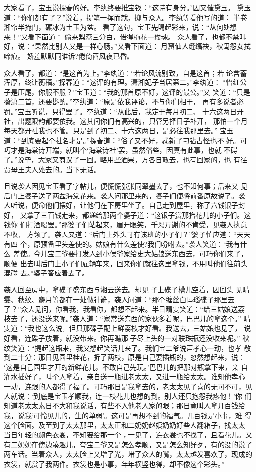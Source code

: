 大家看了，宝玉说探春的好。李纨终要推宝钗：“这诗有身分。”因又催黛玉。
黛玉道：“你们都有了？”说着，提笔一挥而就，掷与众人。李纨等看他写的道：
半卷湘帘半掩门，碾冰为土玉为盆。
看了这句，宝玉先喝起彩来，说：“从何处想来！”又看下面道：
偷来梨蕊三分白，借得梅花一缕魂。
众人看了，也都不禁叫好，说：“果然比别人又是一样心肠。”又看下面道：
月窟仙人缝缟袂，秋闺怨女拭啼痕。
娇羞默默同谁诉?倦倚西风夜已昏。

众人看了，都道：“是这首为上。”李纨道：“若论风流别致，自是这首；若
论含蓄浑厚，终让蘅稿。”探春道：“这评的有理。潇湘妃子当居第二。”李纨道：
“怡红公子是压尾，你服不服？”宝玉道：“我的那首原不好，这评的最公。”又
笑道：“只是蘅潇二首，还要斟酌。”李纨道：“原是依我评论，不与你们相干，
再有多说者必罚。”宝玉听说，只得罢了。李纨道：“从此后，我定于每月初二、
十六这两日开社，出题限韵都要依我。这其间你们有高兴的，只管另择日子补开，
那怕一个月每天都开社我也不管。只是到了初二、十六这两日，是必往我那里去。”
宝玉道：“到底要起个社名才是。”探春道：“俗了又不好，忒新了刁钻古怪也不
好。可巧才是海棠诗开端，就叫个‘海棠诗社’罢，虽然俗些，因真有此事，也就
不碍了。”说毕，大家又商议了一回。略用些酒果，方各自散去，也有回家的，也
有往贾母王夫人处去的。当下无话。

且说袭人因见宝玉看了字帖儿，便慌慌张张同翠墨去了，也不知何事；后来又
见后门上婆子送了两盆海棠花来。袭人问那里来的，婆子们便将前番原故说了。袭
人听说，便命他们摆好，让他们在下房里坐了。自己走到屋里，称了六钱银子封好，
又拿了三百钱走来，都递给那两个婆子道：“这银子赏那抬花儿的小子们。这钱你
们打酒喝罢。”那婆子们站起来，眉开眼笑，千恩万谢的不肯受，见袭人执意不收，
方领了。袭人又道：“后门上外头可有该班的小子们？”婆子忙应道：“天天有四
个，原预备里头差使的。姑娘有什么差使?我们吩咐去。”袭人笑道：“我有什么
差使。今儿宝二爷要打发人到小侯爷家给史大姑娘送东西去，可巧你们来了，顺便
出去叫后门上小子们雇辆车来，回来你们就往这里拿钱，不用叫他们往前头混碰
去。”婆子答应着去了。

袭人回至房中，拿碟子盛东西与湘云送去。却见子上碟子槽儿空着，因回头
见晴雯、秋纹、麝月等都在一处做针黹，袭人问道：“那个缠丝白玛瑙碟子那里去
了？”众人见问，你看我，我看你，都想不起来。半日晴雯笑道：“给三姑娘送荔
枝去了，还没送来呢。”袭人道：“家常送东西的家伙多着呢，巴巴儿的拿这个。”
晴雯道：“我也这么说，但只那碟子配上鲜荔枝才好看。我送去，三姑娘也见了，
说好看，连碟子放着，就没带来。你再瞧那子尽上头的一对联珠瓶还没收来呢。”
秋纹笑道：“提起这瓶来，我又想起笑话儿来了。我们宝二爷说声孝心一动，也孝
敬到二十分：那日见园里桂花，折了两枝，原是自己要插瓶的，忽然想起来，说：
‘这是自己园里才开的新鲜花儿，不敢自己先玩。’巴巴儿的把那对瓶拿下来，亲
自灌水插好了，叫个人拿着，亲自送一瓶进老太太，又进一瓶给太太。谁知他孝心
一动，连跟的人都得了福了。可巧那日是我拿去的，老太太见了喜的无可不可，见
人就说：‘到底是宝玉孝顺我，连一枝花儿也想的到。别人还只抱怨我疼他！’你
们知道老太太素日不大和我说话，有些不入他老人家的眼；那日竟叫人拿几百钱给
我，说我‘可怜见儿的，生的单弱’。这可是再想不到的福气。几百钱是小事，难
得这个脸面。及至到了太太那里，太太正和二奶奶赵姨奶奶好些人翻箱子，找太太
当日年轻的颜色衣裳，不知要给那一个；一见了，连衣裳也不找了，且看花儿。又
有二奶奶在傍边凑趣儿，夸宝二爷又是怎么孝顺，又是怎么知好歹，有的没的说了
两车话。当着众人，太太脸上又增了光，堵了众人的嘴，太太越发喜欢了，现成的
衣裳，就赏了我两件。衣裳也是小事，年年横竖也得，却不像这个彩头。”

